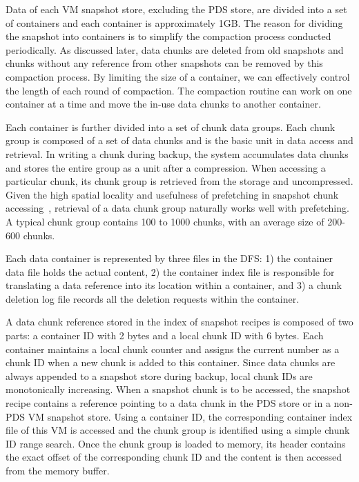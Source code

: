 Data of each VM snapshot store, excluding the PDS store, are divided into a set of containers and 
each container is approximately 1GB. 
The reason for dividing the snapshot into containers is to simplify the compaction process
conducted periodically. As discussed later, data chunks are deleted from old snapshots
and chunks without any reference from other snapshots can be removed by this compaction process.
By limiting the size of a container, we can effectively control the length of each round of compaction.
The compaction  routine can work on one container at a time and move the in-use data chunks to another container. 

Each container is further divided into a set of chunk data groups. Each chunk group is composed of
a set of data chunks and is the basic unit in data access and retrieval. 
In writing a chunk during backup, the system accumulates data chunks and stores the entire
group as a unit after a compression.
When accessing a particular chunk, its chunk group is retrieved from the storage
and uncompressed. Given the high spatial locality and usefulness of prefetching  in 
snapshot chunk accessing~\cite{Guo2011,foundation08},
retrieval of  a data chunk  group naturally works well with prefetching. 
A  typical chunk group contains 100 to 1000 chunks, with an average size of 
200-600 chunks.

Each data container is represented by three files in the DFS:
1) the container data file holds the actual content, 
2) the container index file is responsible for translating a data reference
into its location within a container, and 
3) a chunk deletion log file records all the deletion requests within  the container.

A data chunk reference stored in the index of snapshot recipes
is composed of two parts: a container ID with 2 bytes and a local chunk ID with 6 bytes.
Each container maintains a local  chunk counter and assigns the current number 
as a chunk ID  when  a new chunk is added to this  container. 
Since data chunks are always appended to a snapshot store during backup, 
local chunk IDs are monotonically increasing.
When a snapshot chunk is to be accessed, the snapshot recipe contains a reference pointing to  a data chunk
in the PDS store or in a non-PDS VM snapshot  store. 
Using  a container ID, the corresponding container index file of this VM is accessed and 
the chunk group is identified using a simple chunk ID range search. Once the chunk group is loaded to memory, 
its header contains the exact offset of the corresponding chunk ID and the content is then accessed from the memory buffer.

